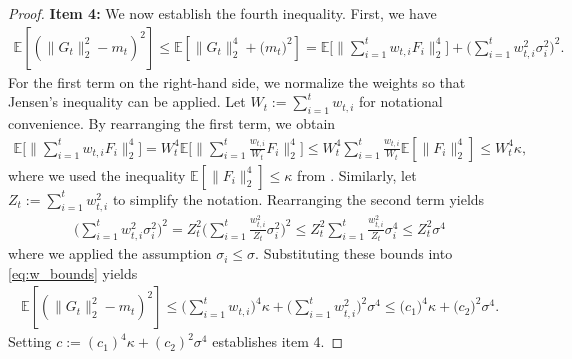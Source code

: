 \documentclass[a4paper, 11pt]{article}
\newcommand{\E}{\mathbb E}
\theoremstyle{definition}
\begin{document}
\begin{proof}
	\vspace{5pt}
	\noindent
	\textbf{Item 4:}
	We now establish the fourth inequality. First, we have
	\begin{align}
		\E\left[ \left( \| G_t \|_2^2 - m_t \right)^2 \right] \le \E\left[ \| G_t \|_2^4 + \big( m_t \big)^2 \right] = \E\bigg[ \bigg\| \sum_{i=1}^{t} w_{t,i} F_i \bigg\|_2^4 \bigg] + \bigg( \sum_{i=1}^{t} w_{t,i}^2 \sigma_i^2 \bigg)^2 .
	\end{align}
    For the first term on the right-hand side, we normalize the weights so that Jensen's inequality can be applied.
    Let $W_t := \sum_{i = 1}^{t} w_{t,i}$ for notational convenience.
    By rearranging the first term, we obtain
	\begin{align}
		\E\bigg[ \bigg\| \sum_{i=1}^{t} w_{t,i} F_i \bigg\|_2^4 \bigg] = W_t^4 \E\bigg[ \bigg\| \sum_{i=1}^{t} \frac{w_{t,i}}{W_t} F_i \bigg\|_2^4 \bigg] \le W_t^4 \sum_{i=1}^{t} \frac{w_{t,i}}{W_t} \E[ \|  F_i \|_2^4 ] \le W_t^4 \kappa , 
	\end{align}
    where we used the inequality $\E[ \|  F_i \|_2^4 ] \le \kappa$ from .
	Similarly, let $Z_t := \sum_{i = 1}^{t} w_{t,i}^2$ to simplify the notation.
	Rearranging the second term yields
	\begin{align}
		\bigg( \sum_{i=1}^{t} w_{t,i}^2 \sigma_i^2 \bigg)^2 = Z_t^2 \bigg( \sum_{i=1}^{t} \frac{w_{t,i}^2}{Z_t} \sigma_i^2 \bigg)^2 \le Z_t^2 \sum_{i=1}^{t} \frac{w_{t,i}^2}{Z_t} \sigma_i^4 \le Z_t^2 \sigma^4 
	\end{align}
    where we applied the assumption $\sigma_i \le \sigma$.
	Substituting these bounds into \eqref{eq:w_bounds} yields
	\begin{align}
		\E\left[ \left( \| G_t \|_2^2 - m_t \right)^2 \right] \le \bigg( \sum_{i=1}^{t} w_{t,i} \bigg)^4 \kappa + \bigg( \sum_{i=1}^{t} w_{t,i}^2 \bigg)^2 \sigma^4 \le \big( c_1 \big)^4 \kappa + \big( c_2 \big)^2 \sigma^4 .
	\end{align}
	Setting $c := ( c_1 )^4 \kappa + ( c_2 )^2 \sigma^4$ establishes item 4.
	

\end{proof}
\end{document}

